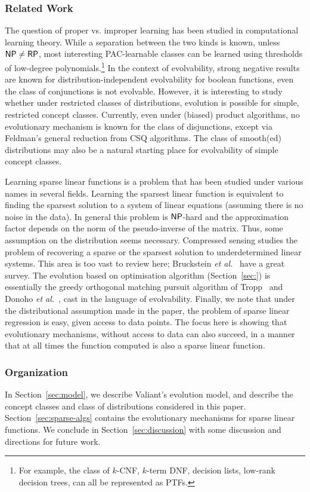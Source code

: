 \subsubsection*{Related Work}

The question of proper vs. improper learning has been studied in computational
learning theory. While a separation between the two kinds is known, unless $\mathsf{NP}
\neq \mathsf{RP}$, most interesting PAC-learnable classes can be learned using thresholds
of low-degree polynomials.\footnote{For example, the class of $k$-CNF, $k$-term
DNF, decision lists, low-rank decision trees, can all be represented as PTFs.}
In the context of evolvability, strong negative results are known for
distribution-independent evolvability for boolean functions, \eg even the class
of conjunctions is not evolvable. However, it is interesting to study whether
under restricted classes of distributions, evolution is possible for simple,
restricted concept classes. Currently, even under (biased) product algorithms,
no evolutionary mechanism is known for the class of disjunctions, except via
Feldman's general reduction from CSQ algorithms. The class of smooth(ed)
distributions may also be a natural starting place for evolvability of simple
concept classes.


Learning sparse linear functions is a problem that has been studied under
various names in several fields. Learning the sparsest linear function is
equivalent to finding the sparsest solution to a system of linear equations
(assuming there is no noise in the data). In general this problem is $\mathsf{NP}$-hard
and the approximation factor depends on the norm of the pseudo-inverse of the
matrix\cite{Natarjan:1995}. Thus, some assumption on the distribution seems
necessary. Compressed sensing studies the problem of recovering a sparse or
the sparsest solution to underdetermined linear systems.
This area is too vast to review here; Bruckstein
\emph{et al.}~\cite{Donoho:2009-sparse} have a great survey. The evolution based
on optimisation algorithm (Section~\ref{sec:}) is essentially the greedy
orthogonal matching pursuit algorithm of Tropp~\cite{Tropp:2004-greed} and
Donoho \emph{et al.}~\cite{Donoho:2006-recovery}, cast in the language of
evolvability. Finally, we note that under the distributional assumption made in
the paper, the problem of sparse linear regression is easy, given access to data
points. The focus here is showing that evolutionary mechanisms, without access
to data can also succeed, in a manner that at all times the function computed is
also a sparse linear function.

\subsubsection*{Organization}

In Section~\ref{sec:model}, we describe Valiant's evolution model, and describe
the concept classes and class of distributions considered in this paper.
Section~\ref{sec:sparse-algs} contains the evolutionary mechanisms for sparse
linear functions. We conclude in Section~\ref{sec:discussion} with some
discussion and directions for future work.
